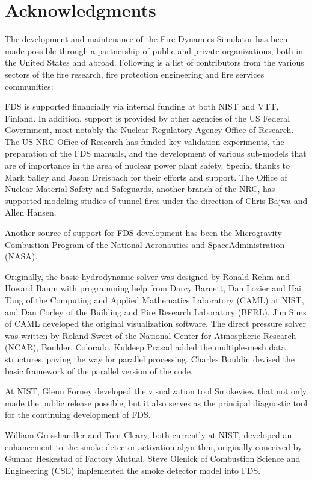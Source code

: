 \documentclass[11pt]{book}
\begin{document}
\chapter{Acknowledgments}

\label{acksection}

The development and maintenance of the Fire Dynamics Simulator has been made possible through
a partnership of public and private organizations, both in the United States and abroad. Following
is a list of contributors from the various sectors of the fire research, fire protection engineering and
fire services communities:

FDS is supported financially via internal funding at both NIST and
VTT, Finland. In addition, support is provided by other agencies of
the US Federal Government, most notably the Nuclear Regulatory Agency
Office of Research. The US NRC Office of Research has funded key
validation experiments, the preparation of the FDS manuals, and the
development of various sub-models that are of importance in the area
of nuclear power plant safety. Special thanks to Mark Salley and Jason
Dreisbach for their efforts and support.  The Office of Nuclear
Material Safety and Safeguards, another branch of the NRC, has
supported modeling studies of tunnel fires under the direction of
Chris Bajwa and Allen Hansen.

Another source of support for FDS development has been the Microgravity Combustion Program of the National 
Aeronautics and SpaceAdministration (NASA).

Originally, the basic hydrodynamic solver was designed by Ronald Rehm
and Howard Baum with programming help from Darcy Barnett, Dan Lozier
and Hai Tang of the Computing and Applied Mathematics Laboratory
(CAML) at NIST, and Dan Corley of the Building and Fire Research
Laboratory (BFRL). Jim Sims of CAML developed the original
visualization software.  The direct pressure solver was written by
Roland Sweet of the National Center for Atmospheric Research (NCAR),
Boulder, Colorado.  Kuldeep Prasad added the multiple-mesh data
structures, paving the way for parallel processing.   Charles Bouldin
devised the basic framework of the parallel version of the code.

At NIST, Glenn Forney developed the visualization tool Smokeview that
not only made the public release possible, but it also serves as the
principal diagnostic tool for the continuing development of
FDS.

William Grosshandler and Tom Cleary, both currently at NIST, developed
an enhancement to the smoke detector activation algorithm, originally
conceived by Gunnar Heskestad of Factory Mutual. Steve
Olenick of Combustion Science and Engineering (CSE) implemented the
smoke detector model into FDS.
\end{document}
